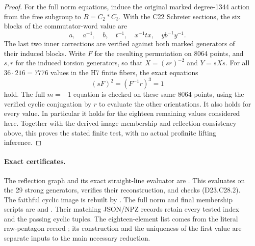 \begin{proof}
For the full norm equations, induce the original marked
degree-1344 action from the free subgroup to $B=C_2*C_3$.
With the C22 Schreier sections, the six blocks of the
commutator-word value are
\[
       a,\quad a^{-1},\quad b,\quad t^{-1},\quad
       x^{-1}tx,\quad yb^{-1}y^{-1}.                      \tag{D23.C28.6}
\]
The last two inner corrections are verified against both
marked generators of their induced blocks.  Write $F$ for
the resulting permutation on 8064 points, and $s,r$ for
the induced torsion generators, so that
$X=(sr)^{-2}$ and $Y=sXs$.
For all $36\cdot216=7776$ values in the H7 finite fibers,
the exact equations
\[
                  (sF)^2=(F^{-1}r)^3=1
\]
hold.  The full $m=-1$ equation is checked on these same
8064 points, using the verified cyclic conjugation by
$r$ to evaluate the other orientations.  It also holds
for every value.  In particular it holds for the eighteen
remaining values considered here.  Together with the
derived-image membership and reflection consistency above,
this proves the stated finite test, with no actual
profinite lifting inference.
\end{proof}

\paragraph{Exact certificates.}
The reflection graph and its exact straight-line evaluator
are .
This evaluates on the 29 strong generators, verifies their
reconstruction, and checks (D23.C28.2).  The faithful cyclic
image is rebuilt by
.
The full norm and final membership scripts are
and .
Their matching JSON/NPZ records retain every tested index
and the passing cyclic tuples.  The eighteen-element list
comes from the literal raw-pentagon record
; its
construction and the uniqueness of the first value are
separate inputs to the main necessary reduction.
